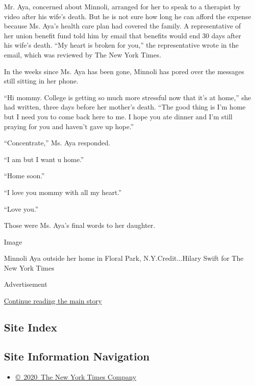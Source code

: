Mr. Aya, concerned about Minnoli, arranged for her to speak to a
therapist by video after his wife's death. But he is not sure how long
he can afford the expense because Ms. Aya's health care plan had covered
the family. A representative of her union benefit fund told him by email
that benefits would end 30 days after his wife's death. ``My heart is
broken for you,'' the representative wrote in the email, which was
reviewed by The New York Times.

In the weeks since Ms. Aya has been gone, Minnoli has pored over the
messages still sitting in her phone.

``Hi mommy. College is getting so much more stressful now that it's at
home,'' she had written, three days before her mother's death. ``The
good thing is I'm home but I need you to come back here to me. I hope
you ate dinner and I'm still praying for you and haven't gave up hope.''

``Concentrate,'' Ms. Aya responded.

``I am but I want u home.''

``Home soon.''

``I love you mommy with all my heart.''

``Love you.''

Those were Ms. Aya's final words to her daughter.

Image

Minnoli Aya outside her home in Floral Park, N.Y.Credit...Hilary Swift
for The New York Times

Advertisement

\protect\hyperlink{after-bottom}{Continue reading the main story}

\hypertarget{site-index}{%
\subsection{Site Index}\label{site-index}}

\hypertarget{site-information-navigation}{%
\subsection{Site Information
Navigation}\label{site-information-navigation}}

\begin{itemize}
\tightlist
\item
  \href{https://help.nytimes.com/hc/en-us/articles/115014792127-Copyright-notice}{©~2020~The
  New York Times Company}
\end{itemize}


